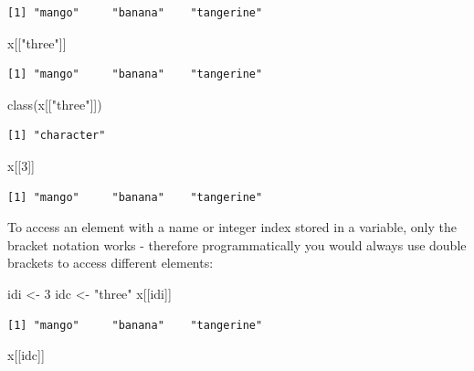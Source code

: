 \documentclass[
]{book}
\newenvironment{Shaded}{\begin{snugshade}}{\end{snugshade}}
\newcommand{\DecValTok}[1]{\textcolor[rgb]{0.00,0.00,0.81}{#1}}
\newcommand{\FunctionTok}[1]{\textcolor[rgb]{0.00,0.00,0.00}{#1}}
\newcommand{\NormalTok}[1]{#1}
\newcommand{\OtherTok}[1]{\textcolor[rgb]{0.56,0.35,0.01}{#1}}
\newcommand{\StringTok}[1]{\textcolor[rgb]{0.31,0.60,0.02}{#1}}
\begin{document}
\begin{verbatim}
[1] "mango"     "banana"    "tangerine"
\end{verbatim}

\begin{Shaded}
\begin{Highlighting}[]
\NormalTok{x[[}\StringTok{"three"}\NormalTok{]]}
\end{Highlighting}
\end{Shaded}

\begin{verbatim}
[1] "mango"     "banana"    "tangerine"
\end{verbatim}

\begin{Shaded}
\begin{Highlighting}[]
\FunctionTok{class}\NormalTok{(x[[}\StringTok{"three"}\NormalTok{]])}
\end{Highlighting}
\end{Shaded}

\begin{verbatim}
[1] "character"
\end{verbatim}

\begin{Shaded}
\begin{Highlighting}[]
\NormalTok{x[[}\DecValTok{3}\NormalTok{]]}
\end{Highlighting}
\end{Shaded}

\begin{verbatim}
[1] "mango"     "banana"    "tangerine"
\end{verbatim}

To access an element with a name or integer index stored in a variable, only the bracket notation works - therefore programmatically you would always use double brackets to access different elements:

\begin{Shaded}
\begin{Highlighting}[]
\NormalTok{idi }\OtherTok{\textless{}{-}} \DecValTok{3}
\NormalTok{idc }\OtherTok{\textless{}{-}} \StringTok{"three"}
\NormalTok{x[[idi]]}
\end{Highlighting}
\end{Shaded}

\begin{verbatim}
[1] "mango"     "banana"    "tangerine"
\end{verbatim}

\begin{Shaded}
\begin{Highlighting}[]
\NormalTok{x[[idc]]}
\end{Highlighting}
\end{Shaded}
\end{document}

